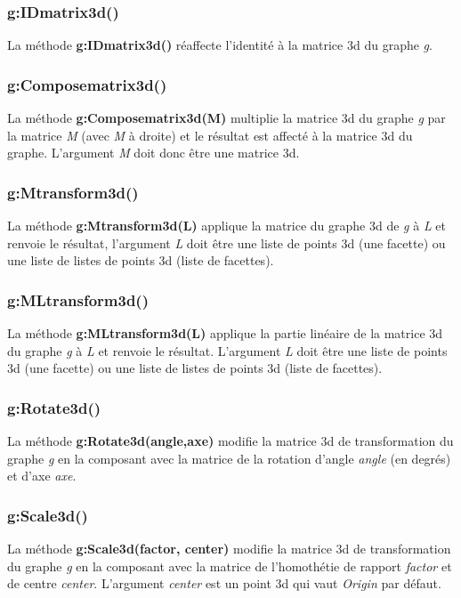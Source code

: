\subsubsection{g:IDmatrix3d()}
La méthode \textbf{g:IDmatrix3d()} réaffecte l'identité à la matrice 3d du graphe \emph g.

\subsubsection{g:Composematrix3d()}
La méthode \textbf{g:Composematrix3d(M)} multiplie la matrice 3d du graphe \emph g par la matrice \emph{M} (avec \emph{M} à droite) et le résultat est affecté à la matrice 3d du graphe. L'argument \emph{M} doit donc être une matrice 3d.

\subsubsection{g:Mtransform3d()}
La méthode \textbf{g:Mtransform3d(L)} applique la matrice du graphe 3d de \emph g à \emph{L} et renvoie le résultat, l'argument \emph L doit être une liste de points 3d (une facette) ou une liste de listes de points 3d (liste de facettes).

\subsubsection{g:MLtransform3d()}
La méthode \textbf{g:MLtransform3d(L)} applique la partie linéaire de la matrice 3d du graphe \emph g à \emph{L} et renvoie le résultat. L'argument \emph L doit être une liste de points 3d (une facette) ou une liste de listes de points 3d (liste de facettes).

\subsubsection{g:Rotate3d()}
La méthode \textbf{g:Rotate3d(angle,axe)} modifie la matrice 3d de transformation du graphe \emph g en la composant avec la matrice de la rotation d'angle \emph{angle} (en degrés) et d'axe \emph{axe}. 

\subsubsection{g:Scale3d()}
La méthode \textbf{g:Scale3d(factor, center)} modifie la matrice 3d de transformation du graphe \emph g en la composant avec la matrice de l'homothétie de rapport \emph{factor} et de centre \emph{center}. L'argument \emph{center} est un point 3d qui vaut \emph{Origin} par défaut.


